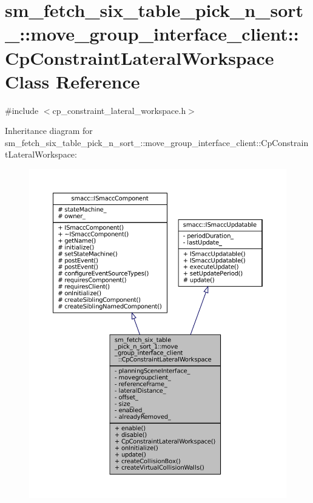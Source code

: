 \hypertarget{classsm__fetch__six__table__pick__n__sort__1_1_1move__group__interface__client_1_1CpConstraintLateralWorkspace}{}\section{sm\+\_\+fetch\+\_\+six\+\_\+table\+\_\+pick\+\_\+n\+\_\+sort\+\_\+:\+:move\+\_\+group\+\_\+interface\+\_\+client\+:\+:Cp\+Constraint\+Lateral\+Workspace Class Reference}
\label{classsm__fetch__six__table__pick__n__sort__1_1_1move__group__interface__client_1_1CpConstraintLateralWorkspace}


{\ttfamily \#include $<$cp\+\_\+constraint\+\_\+lateral\+\_\+workspace.\+h$>$}



Inheritance diagram for sm\+\_\+fetch\+\_\+six\+\_\+table\+\_\+pick\+\_\+n\+\_\+sort\+\_\+:\+:move\+\_\+group\+\_\+interface\+\_\+client\+:\+:Cp\+Constraint\+Lateral\+Workspace\+:
\nopagebreak
\begin{figure}[H]
\begin{center}
\leavevmode
\includegraphics[width=350pt]{classsm__fetch__six__table__pick__n__sort__1_1_1move__group__interface__client_1_1CpConstraintLateralWorkspace__inherit__graph}
\end{center}
\end{figure}


